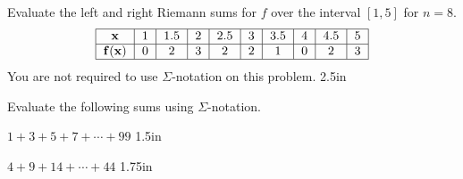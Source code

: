 \documentclass[12pt, addpoints]{exam}
\newcommand{\vect}[1]{\mathbf{#1}}
\newcommand{\vstr}{\vspace{\stretch{1}}}
\theoremstyle{plain}
\begin{document}
\begin{questions}
\question[10] Evaluate the left and right Riemann sums for $f$ over the interval $[1,5]$ for $n=8$.  
\[
\begin{tabular}{ |c|c|c|c|c|c|c|c|c|c| } 
 \hline
 $\vect x$ & 1 & 1.5 & 2 & 2.5 & 3 & 3.5 & 4 & 4.5 & 5 \\ 
 \hline
 $\vect{f(x)}$ & 0 & 2 & 3 & 2 & 2 & 1 & 0 & 2 & 3 \\ 
 \hline
\end{tabular}
\]
You are not required to use $\Sigma$-notation on this problem. 
\vspace
{2.5in}
\vstr

\newpage
  Evaluate the following sums using $\Sigma$-notation.
 
\begin{parts}
\bonuspart[2] $1+3+5+7+\cdots +99$
\vspace
{1.5in}
\vstr

\bonuspart[3] $4+9+14+\cdots +44$
\vspace
{1.75in}
\vstr


\end{parts}
\end{questions}
\end{document}
